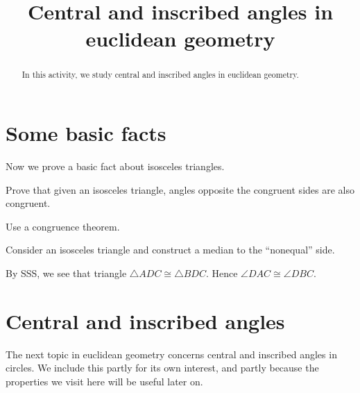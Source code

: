 \documentclass{ximera}
\title{Central and inscribed angles in euclidean geometry}
\begin{document}
\begin{abstract}
In this activity, we study central and inscribed angles in euclidean
geometry.
\end{abstract}
\maketitle

\section{Some basic facts}
Now we prove a basic fact about isosceles triangles.


\begin{problem}
Prove that given an isosceles triangle, angles opposite the congruent
sides are also congruent.
\begin{hint}
Use a congruence theorem.
\end{hint}
\begin{freeResponse}
Consider an isosceles triangle and construct a median to the
``nonequal'' side.
\begin{image}
\end{image}
By SSS, we see that triangle $\triangle ADC \cong \triangle
BDC$. Hence $\angle DAC \cong \angle DBC$.
\end{freeResponse}
\end{problem}


\section{Central and inscribed angles}

The next topic in euclidean geometry concerns central and inscribed
angles in circles. We include this partly for its own interest, and
partly because the properties we visit here will be useful later on.
\end{document}
